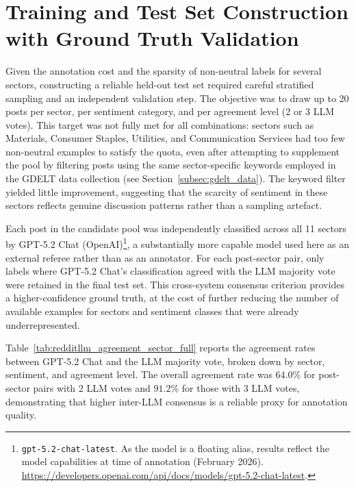 \section{Training and Test Set Construction with Ground Truth Validation}
\label{sec:reddittest_set}

Given the annotation cost and the sparsity of non-neutral labels for several sectors, constructing a reliable held-out test set required careful stratified sampling and an independent validation step. The objective was to draw up to 20 posts per sector, per sentiment category, and per agreement level (2 or 3 LLM votes). This target was not fully met for all combinations: sectors such as Materials, Consumer Staples, Utilities, and Communication Services had too few non-neutral examples to satisfy the quota, even after attempting to supplement the pool by filtering posts using the same sector-specific keywords employed in the GDELT data collection (see Section~\ref{subsec:gdelt_data}). The keyword filter yielded little improvement, suggesting that the scarcity of sentiment in these sectors reflects genuine discussion patterns rather than a sampling artefact.

Each post in the candidate pool was independently classified across all 11 sectors by GPT-5.2 Chat (OpenAI)\footnote{\texttt{gpt-5.2-chat-latest}. As the model is a floating alias, results reflect the model capabilities at time of annotation (February 2026). \url{https://developers.openai.com/api/docs/models/gpt-5.2-chat-latest}.}, a substantially more capable model used here as an external referee rather than as an annotator. For each post-sector pair, only labels where GPT-5.2 Chat's classification agreed with the LLM majority vote were retained in the final test set. This cross-system consensus criterion provides a higher-confidence ground truth, at the cost of further reducing the number of available examples for sectors and sentiment classes that were already underrepresented.

Table~\ref{tab:redditllm_agreement_sector_full} reports the agreement rates between GPT-5.2 Chat and the LLM majority vote, broken down by sector, sentiment, and agreement level. The overall agreement rate was $64.0\%$ for post-sector pairs with 2 LLM votes and $91.2\%$ for those with 3 LLM votes, demonstrating that higher inter-LLM consensus is a reliable proxy for annotation quality.


